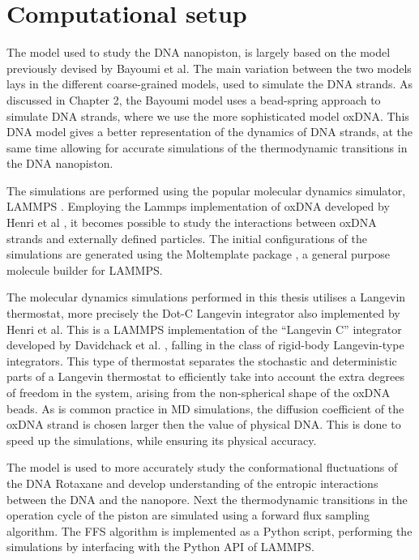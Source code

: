 \section{Computational setup}

The model used to study the DNA nanopiston, is largely based on the model
previously devised by Bayoumi et al. The main variation between the two models lays in
the different coarse-grained models, used to simulate the DNA strands. As discussed in
Chapter 2, the Bayoumi model uses a bead-spring approach to simulate DNA strands, where
we use the more sophisticated model oxDNA. This DNA model gives a better
representation of the dynamics of DNA strands, at the same time allowing for accurate
simulations of the thermodynamic transitions in the DNA nanopiston.

The simulations are performed using the popular molecular dynamics simulator, LAMMPS
\cite{PLIMPTON19951}.
Employing the Lammps implementation of oxDNA developed by Henri et al \cite{Henrich18},
it becomes
possible to study the interactions between oxDNA strands and externally defined
particles. The initial configurations of the simulations are generated using the
Moltemplate package \cite{JEWETT2021}, a general purpose molecule builder for LAMMPS.

The molecular dynamics simulations performed in this thesis utilises a Langevin
thermostat, more precisely the Dot-C Langevin integrator also implemented by Henri et
al. This is a LAMMPS implementation of the “Langevin C” integrator developed by
Davidchack et al. \cite{Davidchack2015}, falling in the class of rigid-body Langevin-type
integrators.
This type of thermostat separates the stochastic and deterministic parts of a Langevin
thermostat to efficiently take into account the extra degrees of freedom in the system,
arising from the non-spherical shape of the oxDNA beads. As is common practice in MD
simulations, the diffusion coefficient of the oxDNA strand is chosen larger then the
value of physical DNA. This is done to speed up the simulations, while ensuring its
physical accuracy.

The model is used to more accurately study the conformational fluctuations of
the DNA Rotaxane and develop understanding of the entropic interactions between the DNA
and the nanopore. Next the thermodynamic transitions in the operation cycle of the piston
are simulated using a forward flux sampling algorithm. The FFS algorithm is implemented
as a Python script, performing the simulations by interfacing with the Python API of
LAMMPS.
